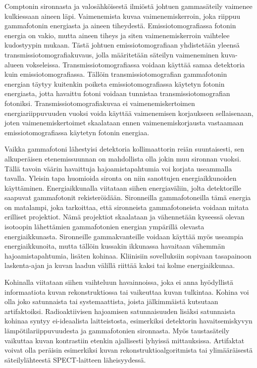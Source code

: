 Comptonin sironnasta ja valosähköisestä ilmiöstä johtuen gammasäteily vaimenee kulkiessaan aineen läpi. Vaimenemista kuvaa vaimenemiskerroin, joka riippuu gammafotonin energiasta ja aineen tiheydestä. Emissiotomografiassa fotonin energia on vakio, mutta aineen tiheys ja siten vaimenemiskerroin vaihtelee kudostyypin mukaan\cite{king_attenuation_2004, cherry_single_2012}. Tästä johtuen emissiotomografiaan yhdistetään yleensä transmissiotomografiakuvaus, jolla määritetään säteilyn vaimeneminen kuva-alueen vokseleissa\cite{king_attenuation_2004, cherry_single_2012, wettenhovi_omegaopen-source_2021}. Transmissiotomografiassa voidaan käyttää samaa detektoria kuin emissiotomografiassa. Tällöin transmissiotomografian gammafotonin energian täytyy kuitenkin poiketa emissiotomografiassa käytetyn fotonin energiasta, jotta havaittu fotoni voidaan tunnistaa transmissiotomografian fotoniksi. Transmissiotomografiakuvaa ei vaimenemiskertoimen energiariippuvuuden vuoksi voida käyttää vaimenemisen korjaukseen sellaisenaan, joten vaimenemiskertoimet skaalataan ennen vaimenemiskorjausta vastaamaan emissiotomografiassa käytetyn fotonin energiaa\cite{cherry_single_2012, king_attenuation_2004, wettenhovi_omegaopen-source_2021}.

Vaikka gammafotoni lähestyisi detektoria kollimaattorin reiän suuntaisesti, sen alkuperäisen etenemissuunnan on mahdollista olla jokin muu sironnan vuoksi. Tällä tavoin väärin havaittuja hajoamistapahtumia voi korjata useammalla tavalla. Yleisin tapa huomioida sironta on niin sanottujen energiaikkunoiden käyttäminen. Energiaikkunalla viitataan siihen energiaväliin, jolta detektorille saapuvat gammafotonit rekisteröidään. Sironneilla gammafotoneilla tämä energia on matalampi, joka tarkoittaa, että sironneista gammafotoneista voidaan mitata erilliset projektiot. Nämä projektiot skaalataan ja vähennetään kyseessä olevan isotoopin lähettämien gammafotonien energian ympärillä olevasta energiaikkunasta. Sironneille gammakvanteille voidaan käyttää myös useampia energiaikkunoita, mutta tällöin kussakin ikkunassa havaitaan vähemmän hajoamistapahtumia, lisäten kohinaa.\cite{cherry_single_2012, king_attenuation_2004} Kliinisiin sovelluksiin sopivaan tasapainoon laskenta-ajan ja kuvan laadun välillä riittää kaksi tai kolme energiaikkunaa\cite{king_attenuation_2004, cherry_single_2012}. 

Kohinalla viitataan siihen vaihteluun havainnoissa, joka ei anna hyödyllistä informaatiota kuvan rekonstruktiossa tai vaikeuttaa kuvan tulkintaa. Kohina voi olla joko satunnaista tai systemaattista, joista jälkimmäistä kutsutaan artifaktoiksi. Radioaktiivisen hajoamisen satunnaisuuden lisäksi satunnaista kohinaa syntyy ei-ideaalista laitteistosta, esimerkiksi detektorin havaitsemiskyvyn lämpötilariippuvuudesta ja gammafotonien sironnasta. Myös taustasäteily vaikuttaa kuvan kontrastiin etenkin ajallisesti lyhyissä mittauksissa.\cite{cherry_single_2012, king_attenuation_2004} Artifaktat voivat olla peräisin esimerkiksi kuvan rekonstruktioalgoritmista tai ylimääräisestä säteilylähteestä SPECT-laitteen läheisyydessä.

